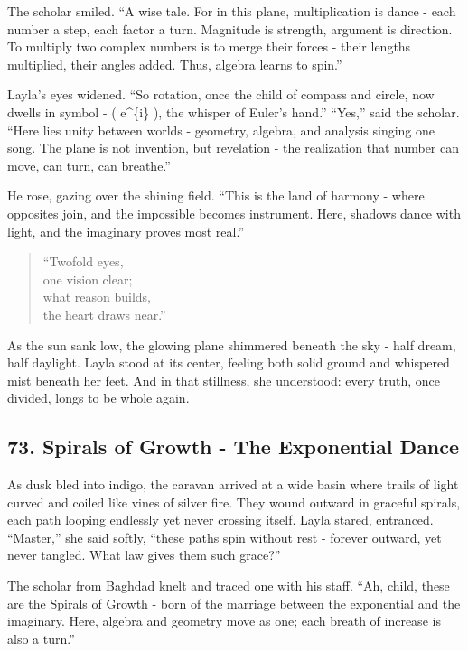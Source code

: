\documentclass[
  letterpaper,
  DIV=11,
  numbers=noendperiod]{scrreprt}
\begin{document}
The scholar smiled. ``A wise tale. For in this plane, multiplication is
dance - each number a step, each factor a turn. Magnitude is strength,
argument is direction. To multiply two complex numbers is to merge their
forces - their lengths multiplied, their angles added. Thus, algebra
learns to spin.''

Layla's eyes widened. ``So rotation, once the child of compass and
circle, now dwells in symbol - ( e\^{}\{i\theta\} ), the whisper of
Euler's hand.'' ``Yes,'' said the scholar. ``Here lies unity between
worlds - geometry, algebra, and analysis singing one song. The plane is
not invention, but revelation - the realization that number can move,
can turn, can breathe.''

He rose, gazing over the shining field. ``This is the land of harmony -
where opposites join, and the impossible becomes instrument. Here,
shadows dance with light, and the imaginary proves most real.''

\begin{quote}
``Twofold eyes,\\
one vision clear;\\
what reason builds,\\
the heart draws near.''
\end{quote}

As the sun sank low, the glowing plane shimmered beneath the sky - half
dream, half daylight. Layla stood at its center, feeling both solid
ground and whispered mist beneath her feet. And in that stillness, she
understood: every truth, once divided, longs to be whole again.

\subsection{73. Spirals of Growth - The Exponential
Dance}\label{spirals-of-growth---the-exponential-dance}

As dusk bled into indigo, the caravan arrived at a wide basin where
trails of light curved and coiled like vines of silver fire. They wound
outward in graceful spirals, each path looping endlessly yet never
crossing itself. Layla stared, entranced. ``Master,'' she said softly,
``these paths spin without rest - forever outward, yet never tangled.
What law gives them such grace?''

The scholar from Baghdad knelt and traced one with his staff. ``Ah,
child, these are the Spirals of Growth - born of the marriage between
the exponential and the imaginary. Here, algebra and geometry move as
one; each breath of increase is also a turn.''
\end{document}
